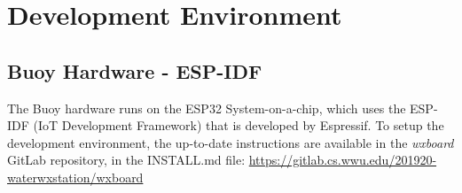 \section{Development Environment}

\subsection{Buoy Hardware - ESP-IDF}

\begin{flushleft}
    The Buoy hardware runs on the ESP32 System-on-a-chip, which uses the ESP-IDF (IoT Development Framework) that is developed by Espressif.
    To setup the development environment, the up-to-date instructions are available in the \emph{wxboard} GitLab repository, in the INSTALL.md file:
    \url{https://gitlab.cs.wwu.edu/201920-waterwxstation/wxboard}
\end{flushleft}